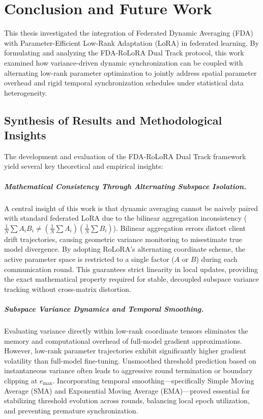 \chapter{Conclusion and Future Work}
\label{chap:conclusion}

This thesis investigated the integration of Federated Dynamic Averaging (FDA) with Parameter-Efficient Low-Rank Adaptation (LoRA) in federated learning. By formulating and analyzing the FDA-RoLoRA Dual Track protocol, this work examined how variance-driven dynamic synchronization can be coupled with alternating low-rank parameter optimization to jointly address spatial parameter overhead and rigid temporal synchronization schedules under statistical data heterogeneity.

\section{Synthesis of Results and Methodological Insights}
\label{sec:synthesis_results}

The development and evaluation of the FDA-RoLoRA Dual Track framework yield several key theoretical and empirical insights:

\paragraph{Mathematical Consistency Through Alternating Subspace Isolation.}
A central insight of this work is that dynamic averaging cannot be naively paired with standard federated LoRA due to the bilinear aggregation inconsistency ($\frac{1}{N}\sum A_i B_i \neq (\frac{1}{N}\sum A_i)(\frac{1}{N}\sum B_i)$). Bilinear aggregation errors distort client drift trajectories, causing geometric variance monitoring to misestimate true model divergence. By adopting RoLoRA's alternating coordinate scheme, the active parameter space is restricted to a single factor ($A$ or $B$) during each communication round. This guarantees strict linearity in local updates, providing the exact mathematical property required for stable, decoupled subspace variance tracking without cross-matrix distortion.

\paragraph{Subspace Variance Dynamics and Temporal Smoothing.}
Evaluating variance directly within low-rank coordinate tensors eliminates the memory and computational overhead of full-model gradient approximations. However, low-rank parameter trajectories exhibit significantly higher gradient volatility than full-model fine-tuning. Unsmoothed threshold prediction based on instantaneous variance often leads to aggressive round termination or boundary clipping at $e_{\max}$. Incorporating temporal smoothing—specifically Simple Moving Average (SMA) and Exponential Moving Average (EMA)—proved essential for stabilizing threshold evolution across rounds, balancing local epoch utilization, and preventing premature synchronization.

